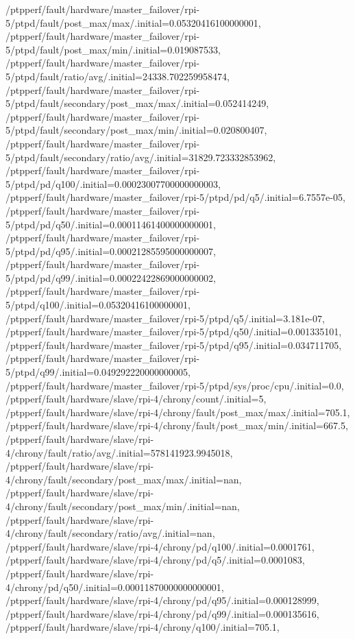 {    /ptpperf/fault/hardware/master_failover/rpi-5/ptpd/fault/post_max/max/.initial=0.05320416100000001,
    /ptpperf/fault/hardware/master_failover/rpi-5/ptpd/fault/post_max/min/.initial=0.019087533,
    /ptpperf/fault/hardware/master_failover/rpi-5/ptpd/fault/ratio/avg/.initial=24338.702259958474,
    /ptpperf/fault/hardware/master_failover/rpi-5/ptpd/fault/secondary/post_max/max/.initial=0.052414249,
    /ptpperf/fault/hardware/master_failover/rpi-5/ptpd/fault/secondary/post_max/min/.initial=0.020800407,
    /ptpperf/fault/hardware/master_failover/rpi-5/ptpd/fault/secondary/ratio/avg/.initial=31829.723332853962,
    /ptpperf/fault/hardware/master_failover/rpi-5/ptpd/pd/q100/.initial=0.00023007700000000003,
    /ptpperf/fault/hardware/master_failover/rpi-5/ptpd/pd/q5/.initial=6.7557e-05,
    /ptpperf/fault/hardware/master_failover/rpi-5/ptpd/pd/q50/.initial=0.00011461400000000001,
    /ptpperf/fault/hardware/master_failover/rpi-5/ptpd/pd/q95/.initial=0.00021285595000000007,
    /ptpperf/fault/hardware/master_failover/rpi-5/ptpd/pd/q99/.initial=0.00022422869000000002,
    /ptpperf/fault/hardware/master_failover/rpi-5/ptpd/q100/.initial=0.05320416100000001,
    /ptpperf/fault/hardware/master_failover/rpi-5/ptpd/q5/.initial=3.181e-07,
    /ptpperf/fault/hardware/master_failover/rpi-5/ptpd/q50/.initial=0.001335101,
    /ptpperf/fault/hardware/master_failover/rpi-5/ptpd/q95/.initial=0.034711705,
    /ptpperf/fault/hardware/master_failover/rpi-5/ptpd/q99/.initial=0.049292220000000005,
    /ptpperf/fault/hardware/master_failover/rpi-5/ptpd/sys/proc/cpu/.initial=0.0,
    /ptpperf/fault/hardware/slave/rpi-4/chrony/count/.initial=5,
    /ptpperf/fault/hardware/slave/rpi-4/chrony/fault/post_max/max/.initial=705.1,
    /ptpperf/fault/hardware/slave/rpi-4/chrony/fault/post_max/min/.initial=667.5,
    /ptpperf/fault/hardware/slave/rpi-4/chrony/fault/ratio/avg/.initial=578141923.9945018,
    /ptpperf/fault/hardware/slave/rpi-4/chrony/fault/secondary/post_max/max/.initial=nan,
    /ptpperf/fault/hardware/slave/rpi-4/chrony/fault/secondary/post_max/min/.initial=nan,
    /ptpperf/fault/hardware/slave/rpi-4/chrony/fault/secondary/ratio/avg/.initial=nan,
    /ptpperf/fault/hardware/slave/rpi-4/chrony/pd/q100/.initial=0.0001761,
    /ptpperf/fault/hardware/slave/rpi-4/chrony/pd/q5/.initial=0.0001083,
    /ptpperf/fault/hardware/slave/rpi-4/chrony/pd/q50/.initial=0.00011870000000000001,
    /ptpperf/fault/hardware/slave/rpi-4/chrony/pd/q95/.initial=0.000128999,
    /ptpperf/fault/hardware/slave/rpi-4/chrony/pd/q99/.initial=0.000135616,
    /ptpperf/fault/hardware/slave/rpi-4/chrony/q100/.initial=705.1,
}
